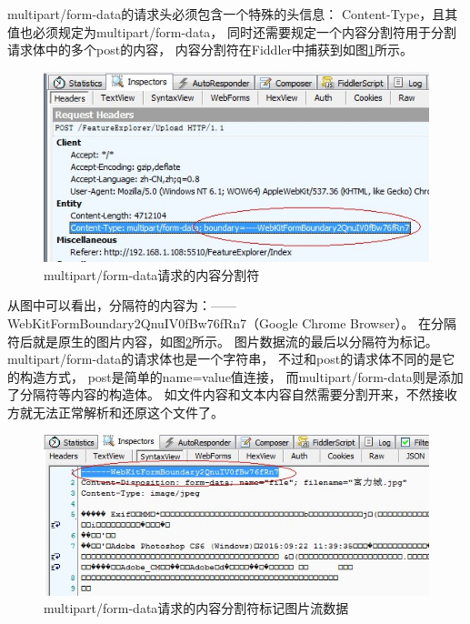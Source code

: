 \documentclass{book}
\newcounter{coderemarks}   %
\newcounter{codevar}     %
\newcommand{\circlemark}[1]{%
\tikz\node[text=white,font=\sffamily\bfseries,inner sep=0.2mm,draw,circle,fill=black]{#1};}
\newcommand{\showremarks}{%
\begin{list}{\circlemark{\arabic{codevar}}} %
{} %
\whiledo{\value{codevar} < \value{coderemarks}}{ %
\item \expandafter\csname codebox\the\value{codevar}\endcsname %
\stepcounter{codevar}} %
\end{list} %
\setcounter{coderemarks}{1}%
\setcounter{codevar}{1}%
}
\begin{document}
\showremarks

multipart/form-data的请求头必须包含一个特殊的头信息：
Content-Type，且其值也必须规定为multipart/form-data，
同时还需要规定一个内容分割符用于分割请求体中的多个post的内容，
内容分割符在Fiddler中捕获到如图\ref{fig:HTTPPostFileContentSplit}所示。

\begin{figure}[htbp]
	\centering
	\includegraphics[scale=0.8]{HTTPPostFileContentSplit.jpg}
	\caption{multipart/form-data请求的内容分割符}
	\label{fig:HTTPPostFileContentSplit}
\end{figure}

从图中可以看出，分隔符的内容为：------WebKitFormBoundary2QnuIV0fBw76fRn7（Google Chrome Browser）。
在分隔符后就是原生的图片内容，如图\ref{fig:HTTPPostSplitWithRawData}所示。
图片数据流的最后以分隔符为标记。
multipart/form-data的请求体也是一个字符串，
不过和post的请求体不同的是它的构造方式，
post是简单的name=value值连接，
而multipart/form-data则是添加了分隔符等内容的构造体。
如文件内容和文本内容自然需要分割开来，不然接收方就无法正常解析和还原这个文件了。

\begin{figure}[htbp]
	\centering
	\includegraphics[scale=0.8]{HTTPPostSplitWithRawData.jpg}
	\caption{multipart/form-data请求的内容分割符标记图片流数据}
	\label{fig:HTTPPostSplitWithRawData}
\end{figure}
\end{document}
